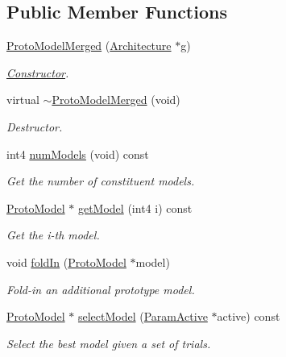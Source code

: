 \subsection*{Public Member Functions}
\begin{DoxyCompactItemize}
\item 
\mbox{\hyperlink{class_proto_model_merged_a89ae5cb14a23eedeba04de6475d46f70}{Proto\+Model\+Merged}} (\mbox{\hyperlink{class_architecture}{Architecture}} $\ast$g)
\begin{DoxyCompactList}\small\item\em \mbox{\hyperlink{class_constructor}{Constructor}}. \end{DoxyCompactList}\item 
virtual \mbox{\hyperlink{class_proto_model_merged_ae9e2963a988d626416b0020fe1229a47}{$\sim$\+Proto\+Model\+Merged}} (void)
\begin{DoxyCompactList}\small\item\em Destructor. \end{DoxyCompactList}\item 
int4 \mbox{\hyperlink{class_proto_model_merged_a529627f8459b79d8f6d0e70210425ba2}{num\+Models}} (void) const
\begin{DoxyCompactList}\small\item\em Get the number of constituent models. \end{DoxyCompactList}\item 
\mbox{\hyperlink{class_proto_model}{Proto\+Model}} $\ast$ \mbox{\hyperlink{class_proto_model_merged_a661295ea5cf3542cfc25b28fefb6a264}{get\+Model}} (int4 i) const
\begin{DoxyCompactList}\small\item\em Get the i-\/th model. \end{DoxyCompactList}\item 
void \mbox{\hyperlink{class_proto_model_merged_a735f43c1161758dcb6e8e2caf6e1c51c}{fold\+In}} (\mbox{\hyperlink{class_proto_model}{Proto\+Model}} $\ast$model)
\begin{DoxyCompactList}\small\item\em Fold-\/in an additional prototype model. \end{DoxyCompactList}\item 
\mbox{\hyperlink{class_proto_model}{Proto\+Model}} $\ast$ \mbox{\hyperlink{class_proto_model_merged_a3679cbe7a72e251e72d9b7140c0fac40}{select\+Model}} (\mbox{\hyperlink{class_param_active}{Param\+Active}} $\ast$active) const
\begin{DoxyCompactList}\small\item\em Select the best model given a set of trials. \end{DoxyCompactList}\item 

\end{DoxyCompactItemize}
